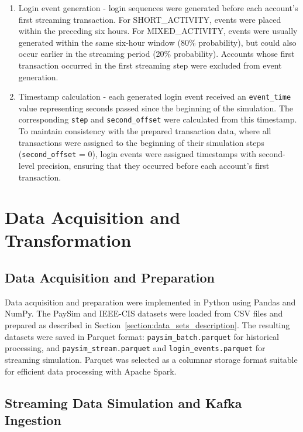 \documentclass[titlepage]{article}
\begin{document}
\begin{enumerate}
    \item Login event generation - login sequences were generated before each account's first streaming transaction. For SHORT\_ACTIVITY, events were placed within the preceding six hours. For MIXED\_ACTIVITY, events were usually generated within the same six-hour window (80\% probability), but could also occur earlier in the streaming period (20\% probability). Accounts whose first transaction occurred in the first streaming step were excluded from event generation.
    \item Timestamp calculation - each generated login event received an \texttt{event\_time} value representing seconds passed since the beginning of the simulation. The corresponding \texttt{step} and \texttt{second\_offset} were calculated from this timestamp. To maintain consistency with the prepared transaction data, where all transactions were assigned to the beginning of their simulation steps (\texttt{second\_offset} = 0), login events were assigned timestamps with second-level precision, ensuring that they occurred before each account's first transaction.
\end{enumerate}

\section{Data Acquisition and Transformation}
\subsection{Data Acquisition and Preparation}
Data acquisition and preparation were implemented in Python using Pandas and NumPy. The PaySim and IEEE-CIS datasets were loaded from CSV files and prepared as described in Section~\ref{section:data_sets_description}. The resulting datasets were saved in Parquet format: \texttt{paysim\_batch.parquet} for historical processing, and \texttt{paysim\_stream.parquet} and \texttt{login\_events.parquet} for streaming simulation. Parquet was selected as a columnar storage format suitable for efficient data processing with Apache Spark.

\subsection{Streaming Data Simulation and Kafka Ingestion}
\end{document}
